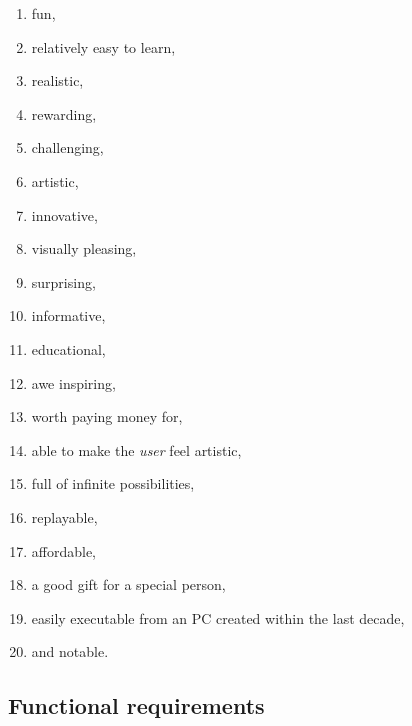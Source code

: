 \begin{multicols}{2}
\begin{enumerate}

  \item fun,

  \item relatively easy to learn,

  \item realistic,

  \item rewarding,

  \item challenging,
  
  \item artistic,
  
  \item innovative,
  
  \item visually pleasing,
  
  \item surprising,
  
  \item informative,
  
  \item educational,
  
  \item awe inspiring,
  
  \item worth paying money for,
  
  \item able to make the \emph{user} feel artistic,
  
  \item full of infinite possibilities,

  \item replayable,

  \item affordable,

  \item a good gift for a special person,

  \item easily executable from an PC created within the last decade,

  \item and notable.

\end{enumerate}
\end{multicols}

\subsection*{Functional requirements}

